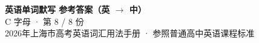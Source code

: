 \documentclass[10pt,a4paper]{article}
\begin{document}
\pagestyle{plain}

\begin{center}
{\LARGE\bfseries 英语单词默写 \quad 参考答案（英 $\to$ 中）}\\[0.22em]
{\large C 字母 · 第 8 / 8 份}\\[0.18em]
{\small 2026年上海市高考英语词汇用法手册 · 参照普通高中英语课程标准}
\end{center}

\vspace{0.2em}
\noindent{\color{rulegray}\rule{\textwidth}{0.8pt}}

\vspace{0.35em}

\vspace{0.25em}
\renewcommand{\arraystretch}{1.32}
\end{document}
